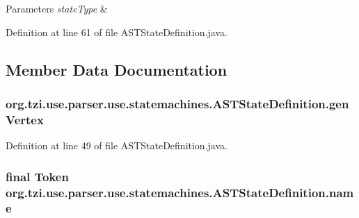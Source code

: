 \begin{DoxyParams}{Parameters}
{\em state\-Type} & \\
\hline
\end{DoxyParams}


Definition at line 61 of file A\-S\-T\-State\-Definition.\-java.



\subsection{Member Data Documentation}
\hypertarget{classorg_1_1tzi_1_1use_1_1parser_1_1use_1_1statemachines_1_1_a_s_t_state_definition_ab64547b8b5d158e1e3e8e4b50d89a0e7}{
\subsubsection[{gen\-Vertex}]{ org.\-tzi.\-use.\-parser.\-use.\-statemachines.\-A\-S\-T\-State\-Definition.\-gen\-Vertex\hspace{0.3cm}{\ttfamily [protected]}}}\label{classorg_1_1tzi_1_1use_1_1parser_1_1use_1_1statemachines_1_1_a_s_t_state_definition_ab64547b8b5d158e1e3e8e4b50d89a0e7}


Definition at line 49 of file A\-S\-T\-State\-Definition.\-java.

\hypertarget{classorg_1_1tzi_1_1use_1_1parser_1_1use_1_1statemachines_1_1_a_s_t_state_definition_a5294416642d3a2490f6e55895a6aa7fb}{
\subsubsection[{name}]{\setlength{\rightskip}{0pt plus 5cm}final Token org.\-tzi.\-use.\-parser.\-use.\-statemachines.\-A\-S\-T\-State\-Definition.\-name\hspace{0.3cm}{\ttfamily [protected]}}}\label{classorg_1_1tzi_1_1use_1_1parser_1_1use_1_1statemachines_1_1_a_s_t_state_definition_a5294416642d3a2490f6e55895a6aa7fb}



